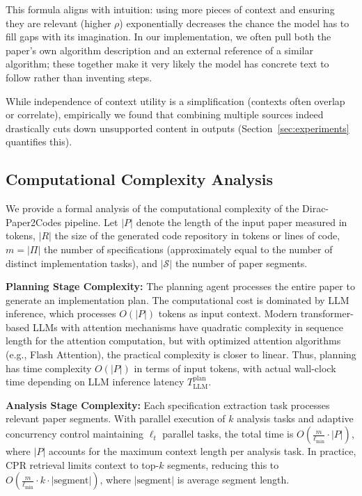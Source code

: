 \documentclass{ieeeaccess}
\begin{document}
This formula aligns with intuition: using more pieces of context and ensuring they are relevant (higher $\rho$) exponentially decreases the chance the model has to fill gaps with its imagination. In our implementation, we often pull both the paper's own algorithm description and an external reference of a similar algorithm; these together make it very likely the model has concrete text to follow rather than inventing steps.

While independence of context utility is a simplification (contexts often overlap or correlate), empirically we found that combining multiple sources indeed drastically cuts down unsupported content in outputs (Section~\ref{sec:experiments} quantifies this).

\subsection{Computational Complexity Analysis}
We provide a formal analysis of the computational complexity of the Dirac-Paper2Codes pipeline. Let \(|P|\) denote the length of the input paper measured in tokens, \(|R|\) the size of the generated code repository in tokens or lines of code, \(m = |\Pi|\) the number of specifications (approximately equal to the number of distinct implementation tasks), and \(|\mathcal{S}|\) the number of paper segments.

\textbf{Planning Stage Complexity:} The planning agent processes the entire paper to generate an implementation plan. The computational cost is dominated by LLM inference, which processes \(O(|P|)\) tokens as input context. Modern transformer-based LLMs with attention mechanisms have quadratic complexity in sequence length for the attention computation, but with optimized attention algorithms (e.g., Flash Attention), the practical complexity is closer to linear. Thus, planning has time complexity \(O(|P|)\) in terms of input tokens, with actual wall-clock time depending on LLM inference latency \(T_{\text{LLM}}^{\text{plan}}\).

\textbf{Analysis Stage Complexity:} Each specification extraction task processes relevant paper segments. With parallel execution of \(k\) analysis tasks and adaptive concurrency control maintaining \(\ell_t\) parallel tasks, the total time is \(O(\frac{m}{\ell_{\min}} \cdot |P|)\), where \(|P|\) accounts for the maximum context length per analysis task. In practice, CPR retrieval limits context to top-\(k\) segments, reducing this to \(O(\frac{m}{\ell_{\min}} \cdot k \cdot |\text{segment}|)\), where \(|\text{segment}|\) is average segment length.
\end{document}
